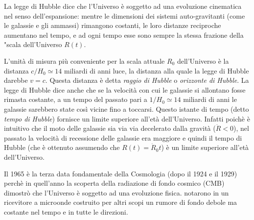 La legge di Hubble dice che l'Universo è soggetto ad una evoluzione cinematica
nel senso dell'espansione: mentre le dimensioni dei sistemi auto-gravitanti
(come le galassie e gli ammassi) rimangono costanti, le loro distanze reciproche
aumentano nel tempo, e ad ogni tempo esse sono sempre la stessa frazione della
"scala dell'Universo $R(t)$.

L'unità di misura più conveniente per la scala attuale $R_0$ dell'Universo è la
distanza $c/H_0 \simeq 14$ miliardi di anni luce, la distanza alla quale la
legge di Hubble darebbe $v=c$.  Questa distanza è detta \emph{raggio di Hubble}
o \emph{orizzonte di Hubble}.  La legge di Hubble dice anche che se la velocità
con cui le galassie si allontano fosse rimasta costante, a un tempo del passato
pari a $1/H_0 \simeq 14$ miliardi di anni le galassie sarebbero state così
vicine fino a toccarsi.  Questo istante di tempo (detto \emph{tempo di Hubble})
fornisce un limite superiore all'età dell'Universo.  Infatti poichè è intuitivo
che il moto delle galassie sia via via decelerato dalla gravità ($\ddot{R} <
0$), nel passato la velocità di recessione delle galassie era maggiore e quindi
il tempo di Hubble (che è ottenuto assumendo che $R(t) = \dot{R}_0 t$) è un
limite superiore all'età dell'Universo.

Il 1965 è la terza data fondamentale della Cosmologia (dopo il 1924 e il 1929)
perchè in quell'anno la scoperta della radiazione di fondo cosmico (CMB)
dimostrò che l'Universo è soggetto ad una evoluzione fisica.
\textcite{1965ApJ...142..419P} notarono in un ricevitore a microonde costruito
per altri scopi un rumore di fondo debole ma costante nel tempo e in tutte le
direzioni.

